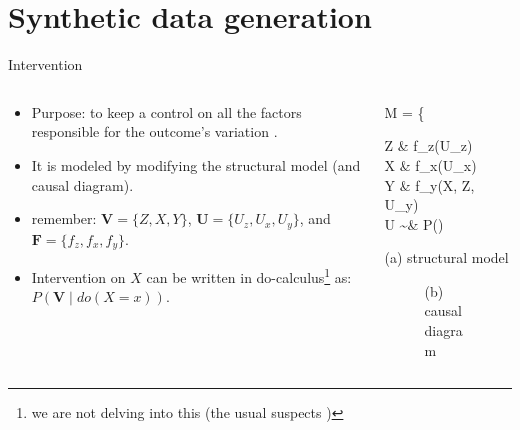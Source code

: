 \section{Synthetic data generation}
%
%
\begin{frame}[t, negative]
	\subsectionpage
\end{frame}
%
%
\begin{frame}
	{Intervention}
	\begin{columns}
		\begin{column}{0.5\textwidth}
			\begin{itemize}
				\item Purpose: to keep a control on all the factors responsible for the outcome's variation .
				\item It is modeled by modifying the structural model (and causal diagram).
				\item remember: $\pmb{V}=\{Z,X,Y\}$, $\pmb{U}=\{U_{z},U_{x},U_{y}\}$, and $\pmb{F}=\{f_{z},f_{x},f_{y}\}$.
				\item Intervention on $X$ can be written in do-calculus\footnote{we are not delving into this (the usual suspects \cite{Pearl_1988, Pearl_2009, Pearl_et_al_2016, Pearl_et_al_2018})} as: $P(\pmb{V} \; | \; do(X=x))$.
			\end{itemize}
		\end{column}
		\begin{column}{0.5\textwidth}  
			\begin{equ}
				M = \left\{ \begin{aligned} 
					Z \leftarrow & \; f_{z}(U_{z}) \\
					X \leftarrow & \; f_{x}(U_{x}) \\
					Y \leftarrow & \; f_{y}(X, Z, U_{y}) \\
					U \sim & \; P()
				\end{aligned} \right
				\caption*{(a) structural model}
			\end{equ}
			\begin{figure}
				\caption*{(b) causal diagram}
			\end{figure}
		\end{column}
	\end{columns}
\end{frame}
